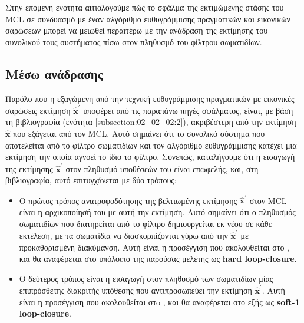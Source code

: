 Στην επόμενη ενότητα αιτιολογούμε πώς το σφάλμα της εκτιμώμενης στάσης
του MCL σε συνδυασμό με έναν αλγόριθμο ευθυγράμμισης πραγματικών και εικονικών
σαρώσεων μπορεί να μειωθεί περαιτέρω με την ανάδραση της εκτίμησης του
συνολικού τους συστήματος πίσω στον πληθυσμό του φίλτρου σωματιδίων.


\subsection{Μέσω ανάδρασης}
\label{subsection:02_02_03:03}

Παρόλο που η εξαγώμενη από την τεχνική ευθυγράμμισης πραγματικών με εικονικές
σαρώσεις εκτίμηση $\hat{\bm{x}}^{\prime}$ υποφέρει από τις παραπάνω πηγές
σφάλματος, είναι, με βάση τη βιβλιογραφία (ενότητα
\ref{subsection:02_02_02:2}), ακριβέστερη από την εκτίμηση
$\bm{\hat{x}}$ που εξάγεται από τον MCL. Αυτό σημαίνει ότι το συνολικό σύστημα
που αποτελείται από το φίλτρο σωματιδίων και τον αλγόριθμο ευθυγράμμισης
κατέχει μια εκτίμηση την οποία αγνοεί το ίδιο το φίλτρο. Συνεπώς, καταλήγουμε
ότι η εισαγωγή της εκτίμησης $\hat{\bm{x}}^{\prime}$ στον πληθυσμό υποθέσεών
του είναι επωφελής, και, στη βιβλιογραφία, αυτό επιτυγχάνεται με δύο τρόπους:

\begin{itemize}
  \item Ο πρώτος τρόπος ανατροφοδότησης της βελτιωμένης εκτίμησης
        $\hat{\bm{x}}^{\prime}$ στον MCL είναι η αρχικοποίησή του με αυτή
        την εκτίμηση. Αυτό σημαίνει ότι ο πληθυσμός σωματιδίων που διατηρείται
        από το φίλτρο δημιουργείται εκ νέου σε κάθε εκτέλεση, με τα σωματίδια
        να διασκορπίζονται γύρω από την $\hat{\bm{x}}^{\prime}$ με
        προκαθορισμένη διακύμανση. Αυτή είναι η προσέγγιση που ακολουθείται στο
        \cite{Vasiljevic2016a}, και θα αναφέρεται στο υπόλοιπο της παρούσας
        μελέτης ως \textbf{hard loop-closure}.
  \item Ο δεύτερος τρόπος είναι η εισαγωγή στον πληθυσμό των σωματιδίων μίας
        επιπρόσθετης διακριτής υπόθεσης που αντιπροσωπεύει την εκτίμηση
        $\hat{\bm{x}}^{\prime}$. Αυτή είναι η προσέγγιση που ακολουθείται στo
        \cite{Peng2018a}, και θα αναφέρεται στο εξής ως
        \textbf{soft-1 loop-closure}.
\end{itemize}

